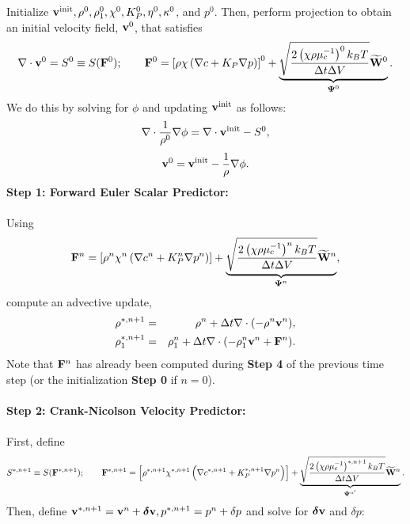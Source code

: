 \documentclass[final]{siamltex}
\def\Fb {{\bf F}}
\def\vb {{\bf v}}
\def\Wb {{\bf W}}
\def\deltab {\boldsymbol{\delta}}
\def\Psib   {\boldsymbol{\Psi}}
\begin{document}
Initialize $\vb^{\rm init}, \rho^0, \rho_1^0, \chi^0, K_P^0, \eta^0, \kappa^0$, and $p^0$.
Then, perform projection to obtain an initial velocity field, $\vb^0$, that satisfies
\begin{equation}
\nabla\cdot\vb^0 = S^0 \equiv S(\Fb^0); \qquad 
\Fb^0 = \left[\rho\chi\left(\nabla c + K_P\nabla p\right)\right]^0 + \underbrace{\sqrt{\frac{2\left(\chi\rho\mu_c^{-1}\right)^0k_B T}{\Delta t\Delta V}}\widetilde\Wb^0}_{\Psib^0}.
\end{equation}
We do this by solving for $\phi$ and updating $\vb^{\rm init}$ as follows:
\begin{equation}
\nabla\cdot\frac{1}{\rho^0}\nabla\phi = \nabla\cdot\vb^{\rm init} - S^0,
\end{equation}
\begin{equation}
\vb^0 = \vb^{\rm init} - \frac{1}{\rho}\nabla\phi.
\end{equation}
{\bf Step 1: Forward Euler Scalar Predictor:}\\ \\
Using
\begin{equation}
\Fb^n = \left[\rho^n\chi^n\left(\nabla c^n + K_P^n\nabla p^n\right)\right] + \underbrace{\sqrt{\frac{2\left(\chi\rho\mu_c^{-1}\right)^nk_B T}{\Delta t\Delta V}}\widetilde\Wb^n}_{\Psib^n},
\end{equation}
compute an advective update,
\begin{eqnarray}
\rho^{*,n+1} &=& \rho^n + \Delta t\nabla\cdot(-\rho^n\vb^n),\label{eq:alg1_1st_rho_adv}\\
\rho_1^{*,n+1} &=& \rho_1^n + \Delta t\nabla\cdot(-\rho_1^n\vb^n + \Fb^n).\label{eq:alg1_1st_rho1_adv}
\end{eqnarray}
Note that $\Fb^n$ has already been computed during {\bf Step 4} of the previous time step
(or the initialization {\bf Step 0} if $n=0$).\\ \\
{\bf Step 2: Crank-Nicolson Velocity Predictor:}\\ \\
First, define
\begin{equation}
S^{*,n+1} \equiv S(\Fb^{*,n+1});
\qquad
\Fb^{*,n+1} = \left[\rho^{*,n+1}\chi^{*,n+1}\left(\nabla c^{*,n+1} + K_P^{*,n+1}\nabla p^n\right)\right] + \underbrace{\sqrt{\frac{2\left(\chi\rho\mu_c^{-1}\right)^{*,n+1}k_B T}{\Delta t\Delta V}}\widetilde\Wb^n}_{\Psib^{n'}}.
\end{equation}
Then, define $\vb^{*,n+1} = \vb^n + \deltab\vb, p^{*,n+1} = p^n + \delta p$ and solve
for $\deltab\vb$ and $\delta p$:
\end{document}
